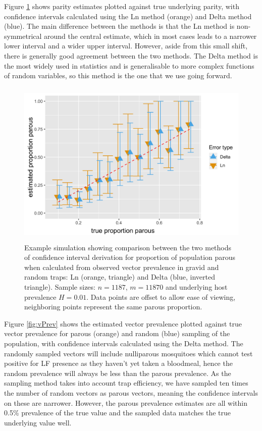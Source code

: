 Figure \ref{fig:parity} shows parity estimates plotted against true underlying parity, with confidence intervals calculated using the Ln method (orange) and Delta method (blue). The main difference between the methods is that the Ln method is non-symmetrical around the central estimate, which in most cases leads to a narrower lower interval and a wider upper interval. However, aside from this small shift, there is generally good agreement between the two methods. The Delta method is the most widely used in statistics and is generalisable to more complex functions of random variables, so this method is the one that we use going forward.

\begin{figure}[ht]
\begin{center}
\includegraphics[height=8cm]{Project/Figures/Xeno/ParousEst.png}
\end{center}
\caption[Estimated vs. true proportion parous.]{Example simulation showing comparison between the two methods of confidence interval derivation for proportion of population parous when calculated from observed vector prevalence in gravid and random traps: Ln (orange, triangle) and Delta (blue, inverted triangle). Sample sizes: $n=1187$, $m=11870$ and underlying host prevalence $H=0.01$. Data points are offset to allow ease of viewing, neighboring points represent the same parous proportion.}
\label{fig:parity}
\end{figure}

Figure \ref{fig:vPrev} shows the estimated vector prevalence plotted against true vector prevalence for parous (orange) and random (blue) sampling of the population, with confidence intervals calculated using the Delta method. The randomly sampled vectors will include nulliparous mosquitoes which cannot test positive for LF presence as they haven't yet taken a bloodmeal, hence the random prevalence will always be less than the parous prevalence. As the sampling method takes into account trap efficiency, we have sampled ten times the number of random vectors as parous vectors, meaning the confidence intervals on these are narrower. However, the parous prevalence estimates are all within 0.5\% prevalence of the true value and the sampled data matches the true underlying value well.


